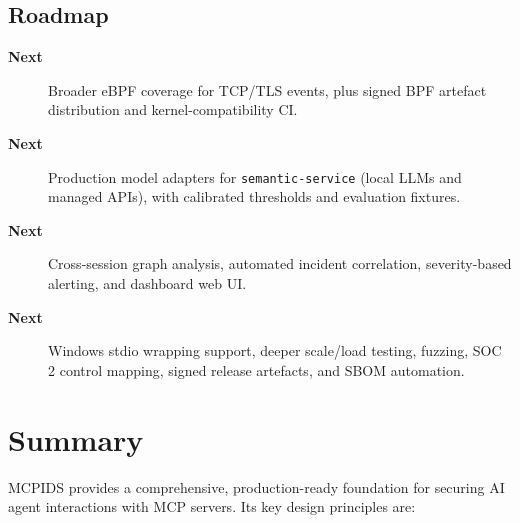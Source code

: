 \documentclass[12pt,a4paper]{report}
\begin{document}
\section{Roadmap}

\begin{description}
  \item[\textbf{Next}] Broader eBPF coverage for TCP/TLS events, plus signed
    BPF artefact distribution and kernel-compatibility CI.

  \item[\textbf{Next}] Production model adapters for
    \texttt{semantic-service} (local LLMs and managed APIs), with calibrated
    thresholds and evaluation fixtures.

  \item[\textbf{Next}] Cross-session graph analysis, automated incident
    correlation, severity-based alerting, and dashboard web UI.

  \item[\textbf{Next}] Windows stdio wrapping support, deeper scale/load
    testing, fuzzing, SOC 2 control mapping, signed release artefacts, and SBOM
    automation.
\end{description}

\chapter{Summary}

MCPIDS provides a comprehensive, production-ready foundation for securing AI
agent interactions with MCP servers. Its key design principles are:
\end{document}
